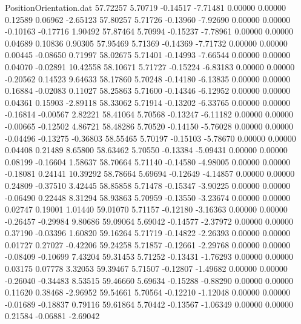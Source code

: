 \begin{filecontents}{PositionOrientation.dat}
  57.72257    5.70719   -0.14517    -7.71481    0.00000    0.00000    0.12589    0.06962   -2.65123
  57.80257    5.71726   -0.13960    -7.92690    0.00000    0.00000   -0.10163   -0.17716    1.90492
  57.87464    5.70994   -0.15237    -7.78961    0.00000    0.00000    0.04689    0.10836    0.90305
  57.95469    5.71369   -0.14369    -7.71732    0.00000    0.00000    0.00445   -0.08650    0.71997
  58.02675    5.71401   -0.14993    -7.66544    0.00000    0.00000    0.04070   -0.02891   10.42558
  58.10671    5.71727   -0.15224    -6.83183    0.00000    0.00000   -0.20562    0.14523    9.64633
  58.17860    5.70248   -0.14180    -6.13835    0.00000    0.00000    0.16884   -0.02083    0.11027
  58.25863    5.71600   -0.14346    -6.12952    0.00000    0.00000    0.04361    0.15903   -2.89118
  58.33062    5.71914   -0.13202    -6.33765    0.00000    0.00000   -0.16814   -0.00567    2.82221
  58.41064    5.70568   -0.13247    -6.11182    0.00000    0.00000   -0.00665   -0.12502    4.86721
  58.48286    5.70520   -0.14150    -5.76028    0.00000    0.00000   -0.04496   -0.13275   -0.36803
  58.55465    5.70197   -0.15103    -5.78670    0.00000    0.00000    0.04408    0.21489    8.65800
  58.63462    5.70550   -0.13384    -5.09431    0.00000    0.00000    0.08199   -0.16604    1.58637
  58.70664    5.71140   -0.14580    -4.98005    0.00000    0.00000   -0.18081    0.24141   10.39292
  58.78664    5.69694   -0.12649    -4.14857    0.00000    0.00000    0.24809   -0.37510    3.42445
  58.85858    5.71478   -0.15347    -3.90225    0.00000    0.00000   -0.06490    0.22448    8.31294
  58.93863    5.70959   -0.13550    -3.23674    0.00000    0.00000    0.02747    0.19001    1.01440
  59.01070    5.71157   -0.12180    -3.16363    0.00000    0.00000   -0.26457   -0.29984    9.80686
  59.09064    5.69042   -0.14577    -2.37972    0.00000    0.00000    0.37190   -0.03396    1.60820
  59.16264    5.71719   -0.14822    -2.26393    0.00000    0.00000    0.01727    0.27027   -0.42206
  59.24258    5.71857   -0.12661    -2.29768    0.00000    0.00000   -0.08409   -0.10699    7.43204
  59.31453    5.71252   -0.13431    -1.76293    0.00000    0.00000    0.03175    0.07778    3.32053
  59.39467    5.71507   -0.12807    -1.49682    0.00000    0.00000   -0.26040   -0.34483    8.53515
  59.46660    5.69634   -0.15288    -0.88290    0.00000    0.00000    0.11620    0.38468   -2.96952
  59.54661    5.70564   -0.12210    -1.12048    0.00000    0.00000   -0.01689   -0.18837    0.79116
  59.61864    5.70442   -0.13567    -1.06349    0.00000    0.00000    0.21584   -0.06881   -2.69042

\end{filecontents}
